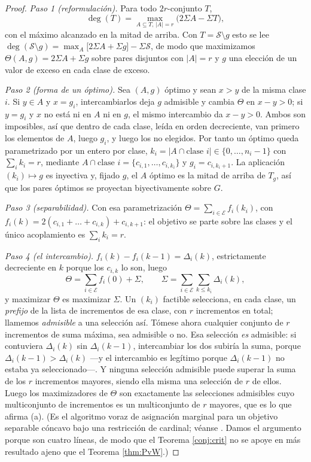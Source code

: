 \documentclass[11pt,reqno]{amsart}
\theoremstyle{plain}
\theoremstyle{definition}
\begin{document}
\begin{proof}
\emph{Paso 1 (reformulación).} Para todo $2r$-conjunto $T$,
\[
\deg(T)=\max_{A\subseteq T,\,|A|=r}\bigl(2\Sigma A-\Sigma T\bigr),
\]
con el máximo alcanzado en la mitad de arriba. Con $T=\mathcal{S}\setminus g$ esto se lee
$\deg(\mathcal{S}\setminus g)=\max_A\bigl[2\Sigma A+\Sigma g\bigr]-\Sigma\mathcal{S}$, de modo que
maximizamos $\Theta(A,g)=2\Sigma A+\Sigma g$ sobre pares disjuntos con $|A|=r$ y $g$ una elección de
un valor de exceso en cada clase de exceso.

\emph{Paso 2 (forma de un óptimo).} Sea $(A,g)$ óptimo y sean $x>y$ de la misma clase $i$. Si $y\in A$
y $x=g_i$, intercambiarlos deja $g$ admisible y cambia $\Theta$ en $x-y>0$; si $y=g_i$ y $x$ no está
ni en $A$ ni en $g$, el mismo intercambio da $x-y>0$. Ambos son imposibles, así que dentro de cada
clase, leída en orden decreciente, van primero los elementos de $A$, luego $g_i$, y luego los no
elegidos. Por tanto un óptimo queda parametrizado por un entero por clase,
$k_i=|A\cap\text{clase }i|\in\{0,\dots,n_i-1\}$ con $\sum_i k_i=r$, mediante
$A\cap\text{clase }i=\{c_{i,1},\dots,c_{i,k_i}\}$ y $g_i=c_{i,k_i+1}$. La aplicación $(k_i)\mapsto g$
es inyectiva y, fijado $g$, el $A$ óptimo es la mitad de arriba de $T_g$, así que los pares óptimos se
proyectan biyectivamente sobre $G$.

\emph{Paso 3 (separabilidad).} Con esa parametrización $\Theta=\sum_{i\in\mathcal{E}}f_i(k_i)$, con
$f_i(k)=2(c_{i,1}+\dots+c_{i,k})+c_{i,k+1}$: el objetivo se parte sobre las clases y el único
acoplamiento es $\sum_i k_i=r$.

\emph{Paso 4 (el intercambio).} $f_i(k)-f_i(k-1)=\Delta_i(k)$, estrictamente decreciente en $k$
porque los $c_{i,k}$ lo son, luego
\[
\Theta=\sum_{i\in\mathcal{E}}f_i(0)+\Sigma,\qquad
\Sigma=\sum_{i\in\mathcal{E}}\sum_{k\le k_i}\Delta_i(k),
\]
y maximizar $\Theta$ es maximizar $\Sigma$. Un $(k_i)$ factible selecciona, en cada clase, un
\emph{prefijo} de la lista de incrementos de esa clase, con $r$ incrementos en total; llamemos
\emph{admisible} a una selección así. Tómese ahora cualquier conjunto de $r$ incrementos de suma
máxima, sea admisible o no. Esa selección \emph{es} admisible: si contuviera $\Delta_i(k)$ sin
$\Delta_i(k-1)$, intercambiar los dos subiría la suma, porque $\Delta_i(k-1)>\Delta_i(k)$ ---y el
intercambio es legítimo porque $\Delta_i(k-1)$ no estaba ya seleccionado---. Y ninguna selección
admisible puede superar la suma de los $r$ incrementos mayores, siendo ella misma una selección de
$r$ de ellos. Luego los maximizadores de $\Theta$ son exactamente las selecciones admisibles cuyo
multiconjunto de incrementos es un multiconjunto de $r$ mayores, que es lo que afirma {\rm(a)}.
(Es el algoritmo voraz de asignación marginal para un objetivo separable cóncavo bajo una
restricción de cardinal; véanse \cite{FG86,IK88}. Damos el argumento porque son cuatro líneas, de
modo que el Teorema \ref{conj:crit} no se apoye en más resultado ajeno que el Teorema
\ref{thm:PvW}.)


\end{proof}
\end{document}
